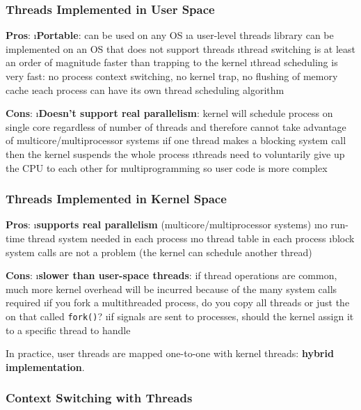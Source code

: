 \documentclass{article}
\begin{document}
    \subsubsection{Threads Implemented in User Space}

    \textbf{Pros}:
    \bl
    \i \textbf{Portable}: can be used on any OS
    \i a user-level threads library can be implemented on an OS that does not support threads
    \i thread switching is at least an order of magnitude faster than trapping to the kernel
    \i thread scheduling is very fast: no process context switching, no kernel trap, no flushing of memory cache
    \i each process can have its own thread scheduling algorithm
    \el

    \noindent \textbf{Cons}:
    \bl
    \i \textbf{Doesn't support real parallelism}: kernel will schedule process on single core regardless of number of threads and therefore cannot take advantage of multicore/multiprocessor systems
    \i if one thread makes a blocking system call then the kernel suspends the whole process
    \i threads need to voluntarily give up the CPU to each other for multiprogramming so user code is more complex
    \el

    \subsubsection{Threads Implemented in Kernel Space}

    \textbf{Pros}:
    \bl
    \i \textbf{supports real parallelism} (multicore/multiprocessor systems)
    \i no run-time thread system needed in each process
    \i no thread table in each process
    \i block system calls are not a problem (the kernel can schedule another thread)
    \el

    \noindent \textbf{Cons}:
    \bl
    \i \textbf{slower than user-space threads}: if thread operations are common, much more kernel overhead will be incurred because of the many system calls required
    \i if you fork a multithreaded process, do you copy all threads or just the on that called \texttt{fork()}?
    \i if signals are sent to processes, should the kernel assign it to a specific thread to handle
    \el

    \noindent In practice, user threads are mapped one-to-one with kernel threads: \textbf{hybrid implementation}. 

    \subsubsection{Context Switching with Threads}
\end{document}
